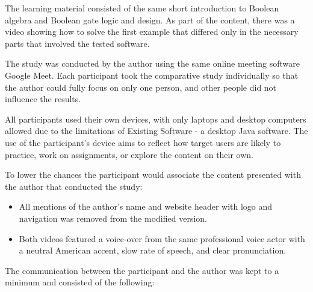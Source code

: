 The learning material consisted of the same short introduction to Boolean algebra and Boolean gate logic and design.
As part of the content, there was a video showing how to solve the first example that differed only in the necessary parts that involved the tested software.

The study was conducted by the author using the same online meeting software Google Meet.
Each participant took the comparative study individually so that the author could fully focus on only one person, and other people did not influence the results.

All participants used their own devices, with only laptops and desktop computers allowed due to the limitations of Existing Software - a desktop Java software.
The use of the participant's device aims to reflect how target users are likely to practice, work on assignments, or explore the content on their own.

To lower the chances the participant would associate the content presented with the author that conducted the study:

\begin{itemize}
    \item All mentions of the author's name and website header with logo and navigation was removed from the modified version.
    \item Both videos featured a voice-over from the same professional voice actor with a neutral American accent, slow rate of speech, and clear pronunciation.
\end{itemize}

The communication between the participant and the author was kept to a minimum and consisted of the following:

